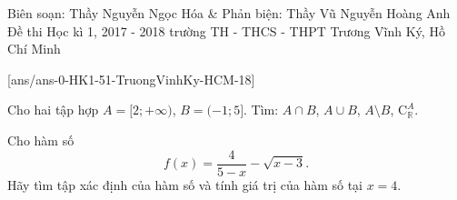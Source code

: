 	\begin{name}
{Biên soạn: Thầy Nguyễn Ngọc Hóa \& Phản biện: Thầy Vũ Nguyễn Hoàng Anh}
		{Đề thi Học kì 1, 2017 - 2018 trường TH - THCS - THPT Trương Vĩnh Ký, Hồ Chí Minh}
	\end{name}
	\setcounter{ex}{0}\setcounter{bt}{0}
	[ans/ans-0-HK1-51-TruongVinhKy-HCM-18]

\begin{bt}%
	Cho hai tập hợp $A=[2;+\infty)$, $B=(-1;5]$. Tìm: $A\cap B$, $A\cup B$, $A\setminus B$, $\mathrm{C}_\mathbb{R}^A$.
\end{bt}

\begin{bt}%
	Cho hàm số $$f(x)=\dfrac{4}{5-x}-\sqrt{x-3}.$$
	Hãy tìm tập xác định của hàm số và tính giá trị của hàm số tại $x=4$.
	\loigiai{
		\bigskip Điều kiện xác định $\heva{&x-3\ge0\\ &5-x\ne0} \Leftrightarrow \heva{&x\ge3\\ &x\ne5}$. Vậy $\mathscr{D}=\left[3;+\infty\right) \setminus\left\lbrace5\right\rbrace$.\\
		$f(4)=\dfrac{4}{5-4}-\sqrt{4-3}=3$.
	}
\end{bt}

